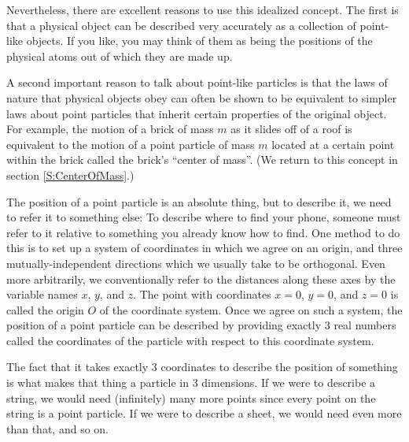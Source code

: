 Nevertheless, there are excellent reasons to use this idealized concept. The first is that a physical object can be described very accurately as a collection of point-like objects. If you like, you may think of them as being the positions of the physical atoms out of which they are made up. 

A second important reason to talk about point-like particles is that the laws of nature that physical objects obey can often be shown to be equivalent to simpler laws about point particles that inherit certain properties of the original object. For example, the motion of a brick of mass $m$ as it slides off of a roof is equivalent to the motion of a point particle of mass $m$ located at a certain point within the brick called the brick's “center of mass”. (We return to this concept in section \ref{S:CenterOfMass}.)

The position of a point particle is an absolute thing, but to describe it, we need to refer it to something else: To describe where to find your phone, someone must refer to it relative to something you already know how to find. One method to do this is to set up a system of coordinates in which we agree on an origin, and three mutually-independent directions which we usually take to be orthogonal. Even more arbitrarily, we conventionally refer to the distances along these axes by the variable names $x$, $y$, and $z$. The point with coordinates $x=0$, $y=0$, and $z=0$ is called the origin $O$ of the coordinate system. Once we agree on such a system, the position of a point particle can be described by providing exactly 3 real numbers called the coordinates of the particle with respect to this coordinate system.

The fact that it takes exactly 3 coordinates to describe the position of something is what makes that thing a particle in 3 dimensions. If we were to describe a string, we would need (infinitely) many more points since every point on the string is a point particle. If we were to describe a sheet, we would need even more than that, and so on. 



